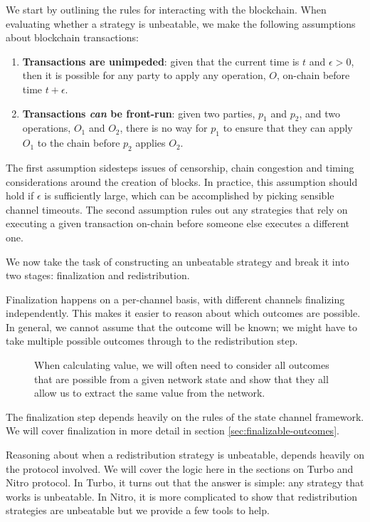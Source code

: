 We start by outlining the rules for interacting with the blockchain.
When evaluating whether a strategy is unbeatable, we make the following assumptions about blockchain transactions:
\begin{enumerate}
  \item \textbf{Transactions are unimpeded}: given that the current time is $t$ and $\epsilon > 0$, then it is possible for any party to apply any operation, $O$, on-chain before time $t + \epsilon$.
  \item \textbf{Transactions \textit{can} be front-run}: given two parties, $p_1$ and $p_2$, and two operations, $O_1$ and $O_2$, there is no way for $p_1$ to ensure that they can apply $O_1$ to the chain before $p_2$ applies $O_2$.
\end{enumerate}
The first assumption sidesteps issues of censorship, chain congestion and timing considerations around the creation of blocks.
In practice, this assumption should hold if $\epsilon$ is sufficiently large, which can be accomplished by picking sensible channel timeouts.
The second assumption rules out any strategies that rely on executing a given transaction on-chain before someone else executes a different one.

We now take the task of constructing an unbeatable strategy and break it into two stages: finalization and redistribution. 

Finalization happens on a per-channel basis, with different channels finalizing independently.
This makes it easier to reason about which outcomes are possible.
In general, we cannot assume that the outcome will be known;
we might have to take multiple possible outcomes through to the redistribution step.
\begin{figure}[h]\centering
  \makebox[\textwidth][c]{}
  \caption{When calculating value, we will often need to consider all outcomes that are possible from a given network state and show that they all allow us to extract the same value from the network.}
\end{figure}
The finalization step depends heavily on the rules of the state channel framework.
We will cover finalization in more detail in section \ref{sec:finalizable-outcomes}.

Reasoning about when a redistribution strategy is unbeatable, depends heavily on the protocol involved. 
We will cover the logic here in the sections on Turbo and Nitro protocol.
In Turbo, it turns out that the answer is simple: any strategy that works is unbeatable.
In Nitro, it is more complicated to show that redistribution strategies are unbeatable but we provide a few tools to help.

